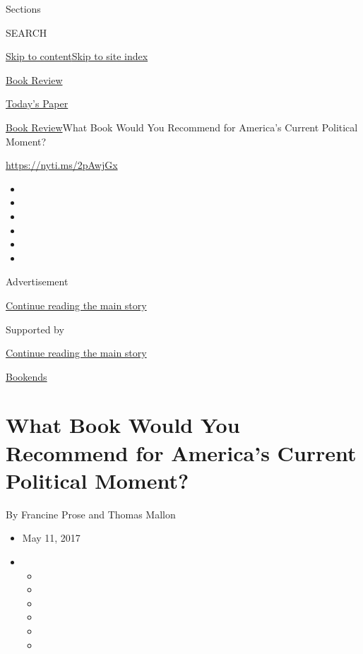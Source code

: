 Sections

SEARCH

\protect\hyperlink{site-content}{Skip to
content}\protect\hyperlink{site-index}{Skip to site index}

\href{https://www.nytimes3xbfgragh.onion/section/books/review}{Book
Review}

\href{https://myaccount.nytimes3xbfgragh.onion/auth/login?response_type=cookie\&client_id=vi}{}

\href{https://www.nytimes3xbfgragh.onion/section/todayspaper}{Today's
Paper}

\href{/section/books/review}{Book Review}\textbar{}What Book Would You
Recommend for America's Current Political Moment?

\url{https://nyti.ms/2pAwjGx}

\begin{itemize}
\item
\item
\item
\item
\item
\item
\end{itemize}

Advertisement

\protect\hyperlink{after-top}{Continue reading the main story}

Supported by

\protect\hyperlink{after-sponsor}{Continue reading the main story}

\href{/column/bookends}{Bookends}

\hypertarget{what-book-would-you-recommend-for-americas-current-political-moment}{%
\section{What Book Would You Recommend for America's Current Political
Moment?}\label{what-book-would-you-recommend-for-americas-current-political-moment}}

By Francine Prose and Thomas Mallon

\begin{itemize}
\item
  May 11, 2017
\item
  \begin{itemize}
  \item
  \item
  \item
  \item
  \item
  \item
  \end{itemize}
\end{itemize}

